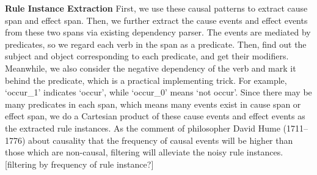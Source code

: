 



\textbf{Rule Instance Extraction}
First, we use these causal patterns to extract cause span and effect span. Then, we further extract the cause events and effect events from these two spans via existing dependency parser.
The events are mediated by predicates, so we regard each verb in the span as a predicate. Then, find out the subject and object corresponding to each predicate, and get their modifiers. Meanwhile, we also consider the negative dependency of the verb and mark it behind the predicate, which is a practical implementing trick. For example, `occur\_1' indicates `occur', while `occur\_0' means `not occur'. 
Since there may be many predicates in each span, which means many events exist in cause span or effect span, we do a Cartesian product of these cause events and effect events as the extracted rule instances. As the comment of philosopher David Hume (1711–1776) about causality that the frequency of causal events will be higher than those which are non-causal, filtering will alleviate the noisy rule instances. [filtering by frequency of rule instance?]

